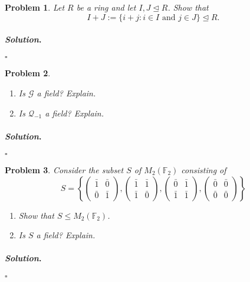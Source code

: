 \documentclass[reqno]{amsart}
\theoremstyle{plain}
\newtheorem{problem}{Problem}
\theoremstyle{definition}
\newenvironment{solution}{\paragraph{\emph{Solution}.}}{\hfill$\square$}
\begin{document}
\begin{problem}
Let $R$ be a ring and let  $I, J \trianglelefteq R$.  Show that
$$I + J := \{i + j : i \in I \text{ and } j \in J \} \trianglelefteq R. $$
\end{problem}
\begin{solution}

\end{solution}

\begin{problem}
\hspace{1cm}
\begin{enumerate}
\item Is $\mathcal{G}$ a field?  Explain.  
\item Is $\mathcal{Q}_{-1}$ a field?  Explain.
\end{enumerate}
\end{problem}
\begin{solution}

\end{solution}


\begin{problem}
Consider the subset $S$ of $M_{2}(\mathbb{F}_{2})$ consisting of
$$S = \left\{\begin{pmatrix}\bar{1} & \bar{0} \\ \bar{0} & \bar{1} \end{pmatrix}, \begin{pmatrix}\bar{1} & \bar{1} \\ \bar{1} & \bar{0} \end{pmatrix}, \begin{pmatrix}\bar{0} & \bar{1} \\ \bar{1} & \bar{1} \end{pmatrix}, \begin{pmatrix}\bar{0} & \bar{0} \\ \bar{0} & \bar{0} \end{pmatrix} \right\} $$
\begin{enumerate}
\item Show that $S \le M_{2}(\mathbb{F}_{2})$.
\item Is $S$ a field?  Explain.
\end{enumerate}

\end{problem}
\begin{solution}

\end{solution}
\end{document}
